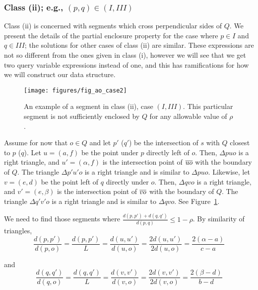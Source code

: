 \subsubsection{Class (ii); e.g., $(p, q) \in (I, III)$}
\label{:rectanges:ao:class2}

Class (ii) is concerned with segments which cross perpendicular sides of $Q$. 
We present the details of the partial enclosure property for the case where $p \in I$ and $q \in III$; the solutions for other cases of class (ii) are similar. 
These expressions are not so different from the ones given in class (i), however we will see that we get two query variable expressions instead of one, and this has ramifications for how we will construct our data structure.

\begin{figure}[t]
\begin{center}
  \texttt{[image: figures/fig\_ao\_case2]}
  \caption[An example of a segment in class (ii), case $(I, III)$.]{An example of a segment in class (ii), case $(I, III)$. This particular segment is not sufficiently enclosed by $Q$ for any allowable value of $\rho$.}
  \label{fig:rectangles:ao:case2}
\end{center}
\end{figure}

Assume for now that $o \in Q$ and let $p'$ ($q'$) be the intersection of $s$ with $Q$ closest to $p$ ($q$).
Let $u = (a, f)$ be the point under $p$ directly left of $o$.
Then, $\Delta p u o$ is a right triangle, and $u' = (\alpha, f)$ is the intersection point of $\overline{u o}$ with the boundary of $Q$.
The triangle $\Delta p' u' o$ is a right triangle and is similar to $\Delta p u o$.
Likewise, let $v = (e, d)$ be the point left of $q$ directly under $o$.
Then, $\Delta q v o$ is a right triangle, and $v' = (e, \beta)$ is the intersection point of $\overline{v o}$ with the boundary of $Q$.
The triangle $\Delta q' v' o$ is a right triangle and is similar to $\Delta q v o$.
See Figure~\ref{fig:rectangles:ao:case2}.

We need to find those segments where $\frac{d(p, p') + d(q, q')}{d(p, q)} \leq 1 - \rho$. By similarity of triangles, 
\[ 
\frac{d(p, p')}{d(p, o)} = \frac{d(p, p')}{L} = \frac{d(u, u')}{d(u, o)} =  \frac{2 d(u, u')}{2 d(u, o)} = \frac{2(\alpha - a)}{c - a}
\]

\noindent and 
\[ 
\frac{d(q, q')}{d(q, o)} = \frac{d(q, q')}{L} = \frac{d(v, v')}{d(v, o)} = \frac{2 d(v, v')}{2 d(v, o)} = \frac{2(\beta - d)}{b - d}
\]

